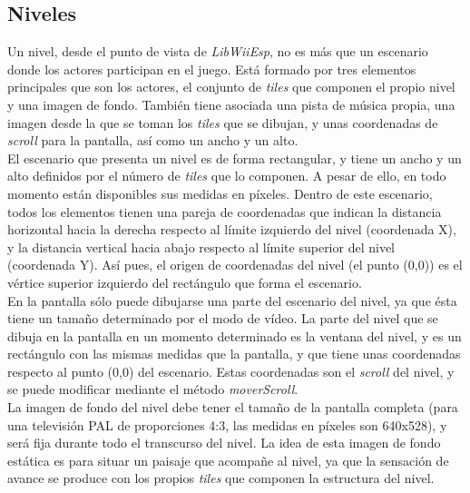 \subsection{Niveles}

Un nivel, desde el punto de vista de \emph{LibWiiEsp}, no es más que un escenario donde los actores participan en el juego. Está formado por tres elementos principales que son los actores, el conjunto de \emph{tiles} que componen el propio nivel y una imagen de fondo. También tiene asociada una pista de música propia, una imagen desde la que se toman los \emph{tiles} que se dibujan, y unas coordenadas de \emph{scroll} para la pantalla, así como un ancho y un alto.\\

El escenario que presenta un nivel es de forma rectangular, y tiene un ancho y un alto definidos por el número de \emph{tiles} que lo componen. A pesar de ello, en todo momento están disponibles sus medidas en píxeles. Dentro de este escenario, todos los elementos tienen una pareja de coordenadas que indican la distancia horizontal hacia la derecha respecto al límite izquierdo del nivel (coordenada X), y la distancia vertical hacia abajo respecto al límite superior del nivel (coordenada Y). Así pues, el origen de coordenadas del nivel (el punto (0,0)) es el vértice superior izquierdo del rectángulo que forma el escenario.\\

En la pantalla sólo puede dibujarse una parte del escenario del nivel, ya que ésta tiene un tamaño determinado por el modo de vídeo. La parte del nivel que se dibuja en la pantalla en un momento determinado es la ventana del nivel, y es un rectángulo con las mismas medidas que la pantalla, y que tiene unas coordenadas respecto al punto (0,0) del escenario. Estas coordenadas son el \emph{scroll} del nivel, y se puede modificar mediante el método \emph{moverScroll}.\\

La imagen de fondo del nivel debe tener el tamaño de la pantalla completa (para una televisión PAL de proporciones 4:3, las medidas en píxeles son 640x528), y será fija durante todo el transcurso del nivel. La idea de esta imagen de fondo estática es para situar un paisaje que acompañe al nivel, ya que la sensación de avance se produce con los propios \emph{tiles} que componen la estructura del nivel.\\

